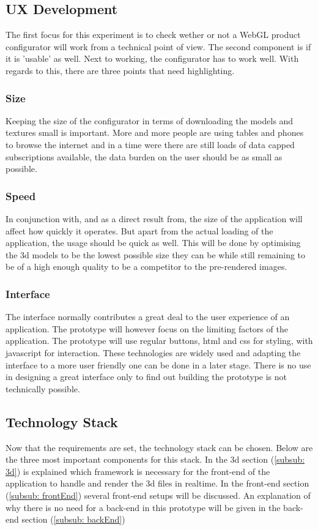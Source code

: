 \subsection{UX Development}
The first focus for this experiment is to check wether or not a WebGL product configurator will work from a technical point of view. The second component is if it is 'usable' as well. Next to working, the configurator has to work well. With regards to this, there are three points that need highlighting.
\subsubsection{Size}
Keeping the size of the configurator in terms of downloading the models and textures small is important. More and more people are using tables and phones to browse the internet and in a time were there are still loads of data capped subscriptions available, the data burden on the user should be as small as possible.

\subsubsection{Speed}
In conjunction with, and as a direct result from, the size of the application will affect how quickly it operates. But apart from the actual loading of the application, the usage should be quick as well. This will be done by optimising the 3d models to be the lowest possible size they can be while still remaining to be of a high enough quality to be a competitor to the pre-rendered images.

\subsubsection{Interface}
The interface normally contributes a great deal to the user experience of an application. The prototype will however focus on the limiting factors of the application. The prototype will use regular buttons, html and css for styling, with javascript for interaction. These technologies are widely used and adapting the interface to a more user friendly one can be done in a later stage. There is no use in designing a great interface only to find out building the prototype is not technically possible.

\subsection{Technology Stack}
Now that the requirements are set, the technology stack can be chosen. Below are the three most important components for this stack. In the 3d section (\ref{subsub: 3d}) is explained which framework is necessary for the front-end of the application to handle and render the 3d files in realtime. In the front-end section (\ref{subsub: frontEnd}) several front-end setups will be discussed. An explanation of why there is no need for a back-end in this prototype will be given in the back-end section (\ref{subsub: backEnd})


